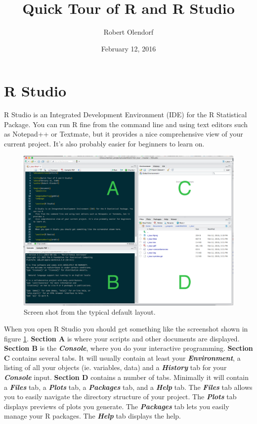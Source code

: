 \documentclass{article}\usepackage[]{graphicx}\usepackage[]{color}
\title{Quick Tour of R and R Studio}
\date{February 12, 2016}
\author{Robert Olendorf}
\begin{document}
  \maketitle
  
  \newpage
  
  \section*{R Studio}
  

  
  R Studio is an Integrated Development Environment (IDE) for the R Statistical Package. You can run R 
  fine from the command line and using text editors such as Notepad++ or Textmate, but it provides a 
  nice comprehensive view of your current project. It's also probably easier for beginners to learn on.
  
  \begin{figure}[t]
    \includegraphics[scale=0.25]{rstudio_screenshot}
    \caption{Screen shot from the typical default layout.}
    \label{fig:screenshot}
    \centering
  \end{figure}
  
 When you open R Studio you should get something like the screenshot shown in figure \ref{fig:screenshot}. \textbf{Section A} is where your scripts and other documents are displayed. \textbf{Section B} is the \textbf{\textit{Console}}, where you do your interactive programming. \textbf{Section C} contains several tabs. It will usually contain at least your \textbf{\textit{Environment}}, a listing of all your objects (ie. variables, data) and a \textbf{\textit{History}} tab for your \textbf{\textit{Console}} input. \textbf{Section D} contains a number of tabs. Minimally it will contain a \textbf{\textit{Files}} tab, a \textbf{\textit{Plots}} tab, a \textbf{\textit{Packages}} tab, and a \textbf{\textit{Help}} tab. The \textbf{\textit{Files}} tab allows you to easily navigate the directory structure of your project. The \textbf{\textit{Plots}} tab displays previews of plots you generate. The \textbf{\textit{Packages}} tab lets you easily manage your R packages. The \textbf{\textit{Help}} tab displays the help.
 
\end{document}
